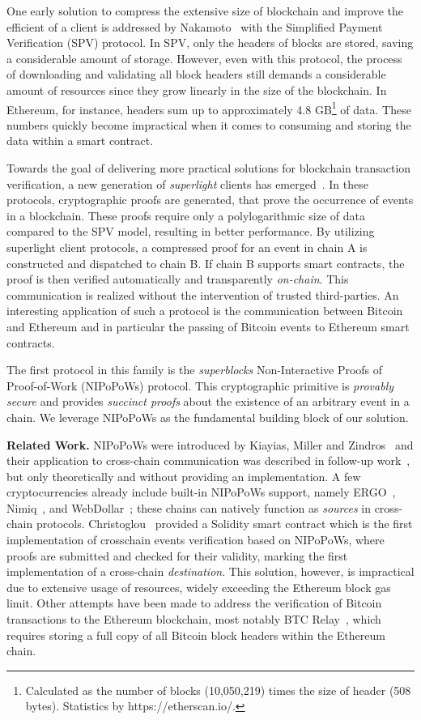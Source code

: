 One early solution to compress the extensive size of blockchain and improve the
efficient of a client is addressed by
Nakamoto~\cite{nakamoto} with the Simplified Payment Verification (SPV)
protocol. In SPV, only the headers of blocks are stored, saving a considerable
amount of storage.  However, even with this protocol, the process of
downloading and validating all block headers still demands a considerable
amount of resources since they grow linearly in the size of the blockchain.
In Ethereum, for instance, headers sum up to approximately 4.8
GB\footnote{Calculated as the number of blocks (10,050,219) times the size of
header (508 bytes). Statistics by https://etherscan.io/.} of data.
These numbers quickly become impractical when it comes to consuming and storing the
data within a smart contract.

Towards the goal of delivering more practical solutions for blockchain
transaction verification, a new generation of \emph{superlight}
clients has emerged~\cite{popow,nipopows,compactsuperblocks,flyclient}. In these
protocols, cryptographic proofs are generated, that prove the occurrence of
events in a blockchain. These proofs require only a polylogarithmic size of
data compared to the SPV model, resulting in better performance. By utilizing
superlight client protocols, a compressed proof for an event in chain A is
constructed and dispatched to chain B. If chain B supports smart contracts, the
proof is then verified automatically and transparently \emph{on-chain}. This
communication is realized without the intervention of trusted third-parties.
An interesting application of such a protocol is the communication between
Bitcoin and Ethereum and in particular the passing of Bitcoin events to Ethereum
smart contracts.

The first protocol in this family is the \emph{superblocks} Non-Interactive
Proofs of Proof-of-Work (NIPoPoWs) protocol. This cryptographic primitive is \emph{provably secure} and
provides \emph{succinct proofs} about the existence of an arbitrary event
in a chain. We leverage NIPoPoWs as the fundamental building block of
our solution.

\noindent
\textbf{Related Work.} NIPoPoWs
were introduced by Kiayias, Miller and Zindros~\cite{nipopows} and their
application to cross-chain communication was described in follow-up
work~\cite{pow-sidechains}, but only theoretically and without providing
an implementation. A few cryptocurrencies already
include built-in NIPoPoWs support, namely ERGO~\cite{ergo}, Nimiq~\cite{nimiq}, and
WebDollar~\cite{webdollar}; these chains can natively function as \emph{sources}
in cross-chain protocols.
Christoglou~\cite{gglou} provided a Solidity smart contract which is the first
implementation of crosschain events verification based on NIPoPoWs, where
proofs are submitted and checked for their validity, marking the first
implementation of a cross-chain \emph{destination}. This solution, however, is
impractical due to extensive usage of resources, widely exceeding the Ethereum
block gas limit.
Other attempts have been made to address the verification of Bitcoin
transactions to the Ethereum blockchain, most notably BTC
Relay~\cite{btcrelay}, which requires storing a full copy of all Bitcoin
block headers within the Ethereum chain.

